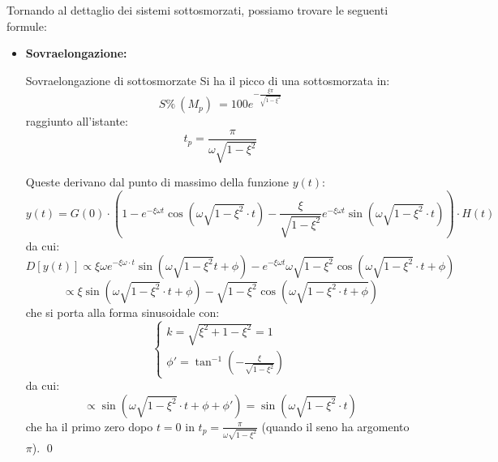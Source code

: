 \documentclass[a4paper,11pt]{article}
\begin{document}
Tornando al dettaglio dei sistemi sottosmorzati, possiamo trovare le seguenti formule:
\begin{itemize}
	\item \textbf{Sovraelongazione:} 
		\begin{theorem}{Sovraelongazione di sottosmorzate}
			Si ha il picco di una sottosmorzata in:
		$$
			S\% \ (M_p) \ = 100 e^{- \frac{\xi \pi}{\sqrt{1 - \xi^2}}}
		$$
		raggiunto all'istante:
		$$
			t_p = \frac{\pi}{\omega \sqrt{1 - \xi^2}}
		$$

		\end{theorem}
		Queste derivano dal punto di massimo della funzione $y(t)$:
		$$
		y(t) = G(0) \cdot \left( 1 - e^{-\xi \omega t} \cos\left(\omega \sqrt{1 - \xi ^2} \cdot t \right) - \frac{\xi}{\sqrt{1 - \xi^2}} e^{-\xi \omega t} \sin\left( \omega \sqrt{1 - \xi^2} \cdot t \right) \right) \cdot H(t)
		$$
		da cui:
		$$
		D \left[ y(t) \right] \propto \xi \omega e^{-\xi \omega \cdot t} \sin\left( \omega \sqrt{1 - \xi^2} t + \phi \right) - e^{-\xi \omega t} \omega \sqrt{1 - \xi^2} \cos\left( \omega \sqrt{1 - \xi^2} \cdot t + \phi \right)
		$$
		$$
		\propto \xi \sin\left( \omega \sqrt{1 - \xi^2} \cdot t + \phi \right) - \sqrt{1 - \xi^2} \cos\left( \omega \sqrt{1 - \xi^2 \cdot t + \phi} \right)
		$$
		che si porta alla forma sinusoidale con:
		\[
			\begin{cases}
				k = \sqrt{ \xi^2 + 1 - \xi^2 } = 1 \\
				\phi' = \tan^{-1} \left( -\frac{\xi}{\sqrt{1 - \xi^2}} \right)
			\end{cases}
		\]
		da cui:
		$$
		\propto \sin\left( \omega \sqrt{1 - \xi^2} \cdot t + \phi + \phi' \right) = \sin\left( \omega \sqrt{1 - \xi^2} \cdot t \right)
		$$
		che ha il primo zero dopo $t = 0$ in $t_p = \frac{\pi}{\omega \sqrt{1 - \xi^2}}$ (quando il seno ha argomento $\pi$). \qed
		

\end{itemize}
\end{document}

